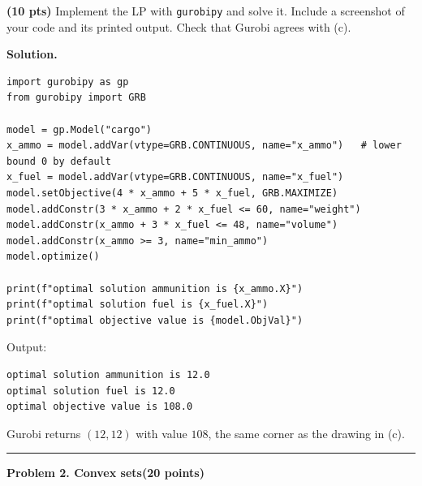 \documentclass[10pt]{article}
\newcommand{\problem}[2]{%
  \par\bigskip
  {\color{ruleink}\rule{\textwidth}{1pt}}\par\nobreak\vspace{3pt}
  {\large\bfseries #2}\hfill{\normalsize\bfseries(#1 points)}\par\nobreak\vspace{4pt}}
\newenvironment{solution}
  {\par\smallskip\begingroup\color{solink}\textbf{Solution.}\ }
  {\endgroup\par}
\begin{document}
\begin{parts}
\item \textbf{(10 pts)} Implement the LP with \texttt{gurobipy} and solve it. Include a
  screenshot of your code and its printed output. Check that Gurobi agrees with (c).

\begin{solution}
\begin{lstlisting}
import gurobipy as gp
from gurobipy import GRB

model = gp.Model("cargo")
x_ammo = model.addVar(vtype=GRB.CONTINUOUS, name="x_ammo")   # lower bound 0 by default
x_fuel = model.addVar(vtype=GRB.CONTINUOUS, name="x_fuel")
model.setObjective(4 * x_ammo + 5 * x_fuel, GRB.MAXIMIZE)
model.addConstr(3 * x_ammo + 2 * x_fuel <= 60, name="weight")
model.addConstr(x_ammo + 3 * x_fuel <= 48, name="volume")
model.addConstr(x_ammo >= 3, name="min_ammo")
model.optimize()

print(f"optimal solution ammunition is {x_ammo.X}")
print(f"optimal solution fuel is {x_fuel.X}")
print(f"optimal objective value is {model.ObjVal}")
\end{lstlisting}
Output:
\begin{lstlisting}
optimal solution ammunition is 12.0
optimal solution fuel is 12.0
optimal objective value is 108.0
\end{lstlisting}
Gurobi returns $(12, 12)$ with value $108$, the same corner as the drawing in (c).
\end{solution}
\end{parts}

\problem{20}{Problem 2. Convex sets}
\end{document}
